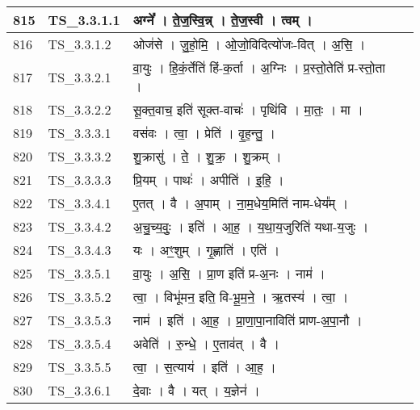 \documentclass[17pt]{extarticle}
\begin{document}
\begin{longtable}{||p{0.4in}||p{0.9in}||p{4.0in}||p{0.9in}||}
        \hline
            815 & TS\_3.3.1.1 & अग्ने᳚   ।   ते॒ज॒स्वि॒न्न्   ।   ते॒ज॒स्वी   ।   त्वम्   ।    &      \\
        \hline
            816 & TS\_3.3.1.2 & ओज॑से   ।   जु॒हो॒मि॒   ।   ओ॒जो॒विदित्यो॑जः{-}वित्   ।   अ॒सि॒   ।    &      \\
        \hline
            817 & TS\_3.3.2.1 & वा॒युः   ।   हि॒कं॒र्तेति॑ हिं{-}क॒र्ता   ।   अ॒ग्निः   ।   प्र॒स्तो॒तेति॑ प्र{-}स्तो॒ता   ।    &      \\
        \hline
            818 & TS\_3.3.2.2 & सू॒क्त॒वाच॒ इति॑ सूक्त{-}वाचः॑   ।   पृथि॑वि   ।   मा॒तः॒   ।   मा   ।    &      \\
        \hline
            819 & TS\_3.3.3.1 & वस॑वः   ।   त्वा॒   ।   प्रेति॑   ।   वृ॒ह॒न्तु॒   ।    &      \\
        \hline
            820 & TS\_3.3.3.2 & शु॒क्रासु॑   ।   ते॒   ।   शु॒क्र॒   ।   शु॒क्रम्   ।    &      \\
        \hline
            821 & TS\_3.3.3.3 & प्रि॒यम्   ।   पाथः॑   ।   अपीति॑   ।   इ॒हि॒   ।    &      \\
        \hline
            822 & TS\_3.3.4.1 & ए॒तत्   ।   वै   ।   अ॒पाम्   ।   ना॒म॒धेय॒मिति॑ नाम{-}धेय᳚म्   ।    &      \\
        \hline
            823 & TS\_3.3.4.2 & अ॒चु॒च्य॒वुः॒   ।   इति॑   ।   आ॒ह॒   ।   य॒था॒य॒जुरिति॑ यथा{-}य॒जुः   ।    &      \\
        \hline
            824 & TS\_3.3.4.3 & यः   ।   अꣳ॒॒शुम्   ।   गृ॒ह्णाति॑   ।   एति॑   ।    &      \\
        \hline
            825 & TS\_3.3.5.1 & वा॒युः   ।   अ॒सि॒   ।   प्रा॒ण इति॑ प्र{-}अ॒नः   ।   नाम॑   ।    &      \\
        \hline
            826 & TS\_3.3.5.2 & त्वा॒   ।   विभू॑मन॒ इति॒ वि{-}भू॒म॒ने॒   ।   ऋ॒तस्य॑   ।   त्वा॒   ।    &      \\
        \hline
            827 & TS\_3.3.5.3 & नाम॑   ।   इति॑   ।   आ॒ह॒   ।   प्रा॒णा॒पा॒नाविति॑ प्राण{-}अ॒पा॒नौ   ।    &      \\
        \hline
            828 & TS\_3.3.5.4 & अवेति॑   ।   रु॒न्धे॒   ।   ए॒ताव॑त्   ।   वै   ।    &      \\
        \hline
            829 & TS\_3.3.5.5 & त्वा॒   ।   स॒त्याय॑   ।   इति॑   ।   आ॒ह॒   ।    &      \\
        \hline
            830 & TS\_3.3.6.1 & दे॒वाः   ।   वै   ।   यत्   ।   य॒ज्ञेन॑   ।    &      \\
        \hline

\end{longtable}
\end{document}
